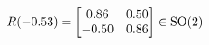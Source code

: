 \documentclass[preview]{standalone}
\begin{document}
\begin{align*}
\special{dvisvgm:raw <g id='unique000'>}R(-0.53) = \begin{bmatrix} 0.86 & 0.50 \\ -0.50 & 0.86 \end{bmatrix} \in \text{SO}(2)\special{dvisvgm:raw </g>}
\end{align*}
\end{document}
